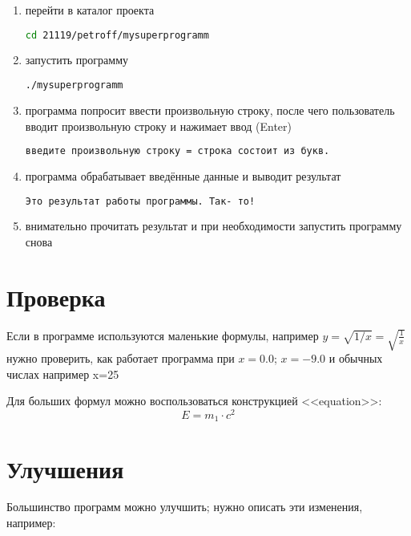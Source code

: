 \begin{enumerate}
\item перейти в каталог проекта
  \begin{lstlisting}[language=bash]
    cd 21119/petroff/mysuperprogramm
  \end{lstlisting}
  
\item запустить программу
  \begin{lstlisting}[language=bash]
    ./mysuperprogramm
  \end{lstlisting}
  
\item программа попросит ввести произвольную строку, после чего
  пользователь вводит произвольную строку и нажимает ввод (Enter)
  \begin{lstlisting}[language=bash]
    введите произвольную строку = строка состоит из букв.
  \end{lstlisting}

\item программа обрабатывает введённые данные и выводит результат
  \begin{lstlisting}[language=bash]
    Это результат работы программы. Так- то!
  \end{lstlisting}
  
\item внимательно прочитать результат и при необходимости запустить
  программу снова
  
\end{enumerate}







\section{Проверка}
Если в программе используются маленькие формулы, например
$y = \sqrt{1/x} = \sqrt{\frac{1}{x}}$ нужно проверить, как работает
программа при $x=0.0$; $x=-9.0$ и обычных числах например x=25

Для больших формул можно воспользоваться конструкцией <<equation>>:
\begin{equation}
  E = m_1 \cdot c^2
\end{equation}







\section{Улучшения}
Большинство программ можно улучшить; нужно
описать эти изменения, например:

